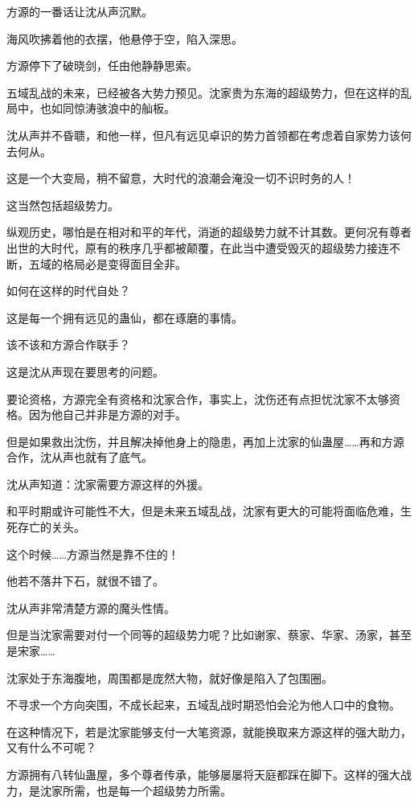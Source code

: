 
\begin{this_body}

方源的一番话让沈从声沉默。

海风吹拂着他的衣摆，他悬停于空，陷入深思。

方源停下了破晓剑，任由他静静思索。

五域乱战的未来，已经被各大势力预见。沈家贵为东海的超级势力，但在这样的乱局中，也如同惊涛骇浪中的舢板。

沈从声并不昏聩，和他一样，但凡有远见卓识的势力首领都在考虑着自家势力该何去何从。

这是一个大变局，稍不留意，大时代的浪潮会淹没一切不识时务的人！

这当然包括超级势力。

纵观历史，哪怕是在相对和平的年代，消逝的超级势力就不计其数。更何况有尊者出世的大时代，原有的秩序几乎都被颠覆，在此当中遭受毁灭的超级势力接连不断，五域的格局必是变得面目全非。

如何在这样的时代自处？

这是每一个拥有远见的蛊仙，都在琢磨的事情。

该不该和方源合作联手？

这是沈从声现在要思考的问题。

要论资格，方源完全有资格和沈家合作，事实上，沈伤还有点担忧沈家不太够资格。因为他自己并非是方源的对手。

但是如果救出沈伤，并且解决掉他身上的隐患，再加上沈家的仙蛊屋……再和方源合作，沈从声也就有了底气。

沈从声知道：沈家需要方源这样的外援。

和平时期或许可能性不大，但是未来五域乱战，沈家有更大的可能将面临危难，生死存亡的关头。

这个时候……方源当然是靠不住的！

他若不落井下石，就很不错了。

沈从声非常清楚方源的魔头性情。

但是当沈家需要对付一个同等的超级势力呢？比如谢家、蔡家、华家、汤家，甚至是宋家……

沈家处于东海腹地，周围都是庞然大物，就好像是陷入了包围圈。

不寻求一个方向突围，不成长起来，五域乱战时期恐怕会沦为他人口中的食物。

在这种情况下，若是沈家能够支付一大笔资源，就能换取来方源这样的强大助力，又有什么不可呢？

方源拥有八转仙蛊屋，多个尊者传承，能够屡屡将天庭都踩在脚下。这样的强大战力，是沈家所需，也是每一个超级势力所需。


\end{this_body}
